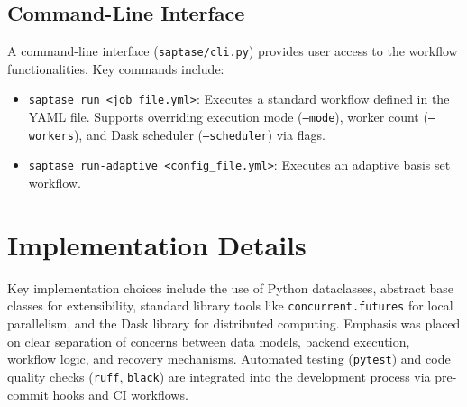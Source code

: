 \documentclass[12pt, a4paper]{report}
\begin{document}
\subsection{Command-Line Interface}
A command-line interface (\texttt{saptase/cli.py}) provides user access to the workflow functionalities. Key commands include:
\begin{itemize}
    \item \texttt{saptase run <job\_file.yml>}: Executes a standard workflow defined in the YAML file. Supports overriding execution mode (\texttt{--mode}), worker count (\texttt{--workers}), and Dask scheduler (\texttt{--scheduler}) via flags.
    \item \texttt{saptase run-adaptive <config\_file.yml>}: Executes an adaptive basis set workflow.
\end{itemize}

\section{Implementation Details}
Key implementation choices include the use of Python dataclasses, abstract base classes for extensibility, standard library tools like \texttt{concurrent.futures} for local parallelism, and the Dask library for distributed computing. Emphasis was placed on clear separation of concerns between data models, backend execution, workflow logic, and recovery mechanisms. Automated testing (\texttt{pytest}) and code quality checks (\texttt{ruff}, \texttt{black}) are integrated into the development process via pre-commit hooks and CI workflows.


%

\end{document}
